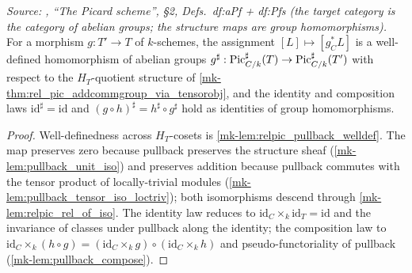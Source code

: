 \begin{lemma}\label{mk-lem:rel_pic_sharp_functorial}
  \leanok

  \textit{Source: \cite{kleiman-picard}, ``The Picard scheme'', \S 2,
  Defs.~df:aPf + df:Pfs (the target category is the category of abelian
  groups; the structure maps are group homomorphisms).}
  For a morphism \(g : T' \to T\) of \(k\)-schemes, the assignment
  \([L] \mapsto [g_C^* L]\) is a well-defined homomorphism of abelian groups
  \(g^\sharp : \operatorname{Pic}^\sharp_{C/k}(T) \to \operatorname{Pic}^\sharp_{C/k}(T')\) with respect
  to the \(H_T\)-quotient structure of
  \ref{mk-thm:rel_pic_addcommgroup_via_tensorobj}, and the identity and
  composition laws \(\mathrm{id}^\sharp = \mathrm{id}\) and
  \((g \circ h)^\sharp = h^\sharp \circ g^\sharp\) hold as identities of group
  homomorphisms.
\end{lemma}
\begin{proof}
  \leanok


Well-definedness across \(H_T\)-cosets is
  \ref{mk-lem:relpic_pullback_welldef}. The map preserves zero because
  pullback preserves the structure sheaf (\ref{mk-lem:pullback_unit_iso})
  and preserves addition because pullback commutes with the tensor product
  of locally-trivial modules (\ref{mk-lem:pullback_tensor_iso_loctriv});
  both isomorphisms descend through \ref{mk-lem:relpic_rel_of_iso}. The
  identity law reduces to
  \(\mathrm{id}_C \times_k \mathrm{id}_T = \mathrm{id}\) and the invariance
  of classes under pullback along the identity; the composition law to
  \(\mathrm{id}_C \times_k (h \circ g) = (\mathrm{id}_C \times_k g) \circ
  (\mathrm{id}_C \times_k h)\) and pseudo-functoriality of pullback
  (\ref{mk-lem:pullback_compose}).
\end{proof}

